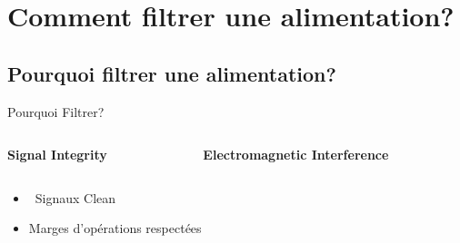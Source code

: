 
\section{Comment filtrer une alimentation?}


\subsection{Pourquoi filtrer une alimentation?}

\begin{frame}{Pourquoi Filtrer?}
    \begin{columns}
        \begin{column}{0.5\textwidth}
            \begin{center}
                \textbf{Signal Integrity}
            \end{center}
        \end{column}
        \begin{column}{0.5\textwidth}
            \begin{center}
                \textbf{Electromagnetic Interference}
            \end{center}
        \end{column}
    \end{columns}
    \begin{columns}
        \begin{column}{0.5\textwidth}
            \begin{itemize}
                \item[] \hspace{-20pt}\textcolor{UDSgreenFierte}{\faWater} ~Signaux Clean
                \item Marges d'opérations respectées
            \end{itemize}


\end{column}
\end{columns}
\end{frame}
